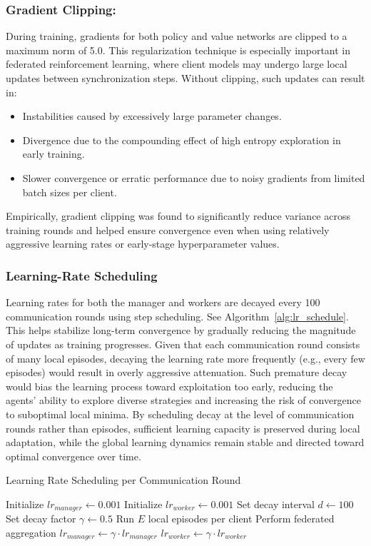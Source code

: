 \documentclass[12pt,a4paper,twoside,openany]{book}
\begin{document}
\subsubsection{Gradient Clipping:} During training, gradients for both policy and value networks are clipped to a maximum norm of 5.0. This regularization technique is especially important in federated reinforcement learning, where client models may undergo large local updates between synchronization steps. Without clipping, such updates can result in:
\begin{itemize}
    \item Instabilities caused by excessively large parameter changes.
    \item Divergence due to the compounding effect of high entropy exploration in early training.
    \item Slower convergence or erratic performance due to noisy gradients from limited batch sizes per client.
\end{itemize}
Empirically, gradient clipping was found to significantly reduce variance across training rounds and helped ensure convergence even when using relatively aggressive learning rates or early-stage hyperparameter values.


\subsubsection{Learning-Rate Scheduling}
Learning rates for both the manager and workers are decayed every 100 communication rounds using step scheduling. See Algorithm~\ref{alg:lr_schedule}. This helps stabilize long-term convergence by gradually reducing the magnitude of updates as training progresses. Given that each communication round consists of many local episodes, decaying the learning rate more frequently (e.g., every few episodes) would result in overly aggressive attenuation. Such premature decay would bias the learning process toward exploitation too early, reducing the agents' ability to explore diverse strategies and increasing the risk of convergence to suboptimal local minima. By scheduling decay at the level of communication rounds rather than episodes, sufficient learning capacity is preserved during local adaptation, while the global learning dynamics remain stable and directed toward optimal convergence over time.

\begin{algorithm}
\caption{Learning Rate Scheduling per Communication Round} \label{alg:lr_schedule}
\begin{algorithmic}
\State Initialize $lr_{manager} \gets 0.001$
\State Initialize $lr_{worker} \gets 0.001$
\State Set decay interval $d \gets 100$
\State Set decay factor $\gamma \gets 0.5$
    \State Run $E$ local episodes per client
    \State Perform federated aggregation
        \State $lr_{manager} \gets \gamma \cdot lr_{manager}$
        \State $lr_{worker} \gets \gamma \cdot lr_{worker}$
    \EndIf
\EndFor
\end{algorithmic}
\end{algorithm}
\end{document}
